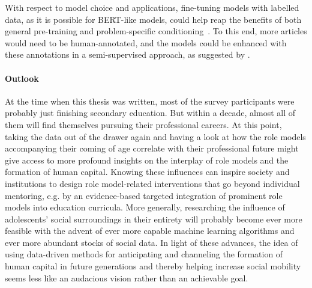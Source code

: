 With respect to model choice and applications, fine-tuning models with labelled data, as it is possible for BERT-like models, could help reap the benefits of both general pre-training and problem-specific conditioning~\autocite{devlin_bert_2019}. To this end, more articles would need to be human-annotated, and the models could be enhanced with these annotations in a semi-supervised approach, as suggested by \textcite{fenske_using_2022}.


\paragraph{Outlook}
At the time when this thesis was written, most of the survey participants were probably just finishing secondary education. But within a decade, almost all of them will find themselves pursuing their professional careers. At this point, taking the data out of the drawer again and having a look at how the role models accompanying their coming of age correlate with their professional future might give access to more profound insights on the interplay of role models and the formation of human capital. Knowing these influences can inspire society and institutions to design role model-related interventions that go beyond individual mentoring, e.g. by an evidence-based targeted integration of prominent role models into education curricula. More generally, researching the influence of adolescents' social surroundings in their entirety will probably become ever more feasible with the advent of ever more capable machine learning algorithms and ever more abundant stocks of social data. In light of these advances, the idea of using data-driven methods for anticipating and channeling the formation of human capital in future generations and thereby helping increase social mobility seems less like an audacious vision rather than an achievable goal.